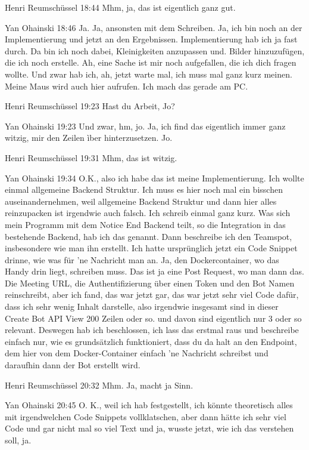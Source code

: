 Henri Reumschüssel   18:44
Mhm, ja, das ist eigentlich ganz gut.

Yan Ohainski   18:46
Ja.
Ja, ansonsten mit dem Schreiben.
Ja, ich bin noch an der Implementierung und jetzt an den Ergebnissen. Implementierung hab ich ja fast durch. Da bin ich noch dabei, Kleinigkeiten anzupassen und.
Bilder hinzuzufügen, die ich noch erstelle. Ah, eine Sache ist mir noch aufgefallen, die ich dich fragen wollte. Und zwar hab ich, ah, jetzt warte mal, ich muss mal ganz kurz meinen.
Meine Maus wird auch hier aufrufen. Ich mach das gerade am PC.

Henri Reumschüssel   19:23
Hast du Arbeit, Jo?

Yan Ohainski   19:23
Und zwar, hm, jo.
Ja, ich find das eigentlich immer ganz witzig, mir den Zeilen ìber hinterzusetzen. Jo.

Henri Reumschüssel   19:31
Mhm, das ist witzig.

Yan Ohainski   19:34
O.K., also ich habe das ist meine Implementierung. Ich wollte einmal allgemeine Backend Struktur. Ich muss es hier noch mal ein bisschen auseinandernehmen, weil allgemeine Backend Struktur und dann hier alles reinzupacken ist irgendwie auch falsch. Ich schreib einmal ganz kurz.
Was sich mein Programm mit dem Notice End Backend teilt, so die Integration in das bestehende Backend, hab ich das genannt. Dann beschreibe ich den Teamspot, insbesondere wie man ihn erstellt. Ich hatte ursprünglich jetzt ein Code Snippet drinne, wie was für 'ne Nachricht man an.
Ja, den Dockercontainer, wo das Handy drin liegt, schreiben muss. Das ist ja eine Post Request, wo man dann das.
Die Meeting URL, die Authentifizierung über einen Token und den Bot Namen reinschreibt, aber ich fand, das war jetzt gar, das war jetzt sehr viel Code dafür, dass ich sehr wenig Inhalt darstelle, also irgendwie insgesamt sind in dieser Create Bot API View 200 Zeilen oder so.
und davon sind eigentlich nur 3 oder so relevant. Deswegen hab ich beschlossen, ich lass das erstmal raus und beschreibe einfach nur, wie es grundsätzlich funktioniert, dass du da halt an den Endpoint, dem hier von dem Docker-Container einfach 'ne Nachricht schreibst und daraufhin dann der Bot erstellt wird.

Henri Reumschüssel   20:32
Mhm.
Ja, macht ja Sinn.

Yan Ohainski   20:45
O. K., weil ich hab festgestellt, ich könnte theoretisch alles mit irgendwelchen Code Snippets vollklatschen, aber dann hätte ich sehr viel Code und gar nicht mal so viel Text und ja, wusste jetzt, wie ich das verstehen soll, ja.

